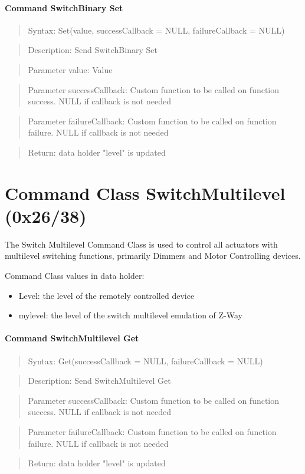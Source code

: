 \paragraph {Command SwitchBinary Set}
\begin{quote} Syntax: Set(value, successCallback = NULL, failureCallback = NULL)\end{quote}
\begin{quote} Description: Send SwitchBinary Set\end{quote}
\begin{quote} Parameter value: Value\end{quote}
\begin{quote} Parameter successCallback: Custom function to be called on function success. NULL if callback is not needed\end{quote}
\begin{quote} Parameter failureCallback: Custom function to be called on function failure. NULL if callback is not needed\end{quote}
\begin{quote} Return: data holder "level" is updated\end{quote}

\section{Command Class SwitchMultilevel (0x26/38)}

The Switch Multilevel Command Class is used to control all actuators with multilevel switching functions, primarily Dimmers and Motor Controlling devices. 

Command Class values in data holder:
\begin{itemize}
\item Level: the level of the remotely controlled device
\item mylevel:  the level of the switch multilevel emulation of Z-Way
\end{itemize}

\paragraph {Command SwitchMultilevel Get}
\begin{quote} Syntax: Get(successCallback = NULL, failureCallback = NULL)\end{quote}
\begin{quote} Description: Send SwitchMultilevel Get\end{quote}
\begin{quote} Parameter successCallback: Custom function to be called on function success. NULL if callback is not needed\end{quote}
\begin{quote} Parameter failureCallback: Custom function to be called on function failure. NULL if callback is not needed\end{quote}
\begin{quote} Return: data holder "level" is updated\end{quote}

